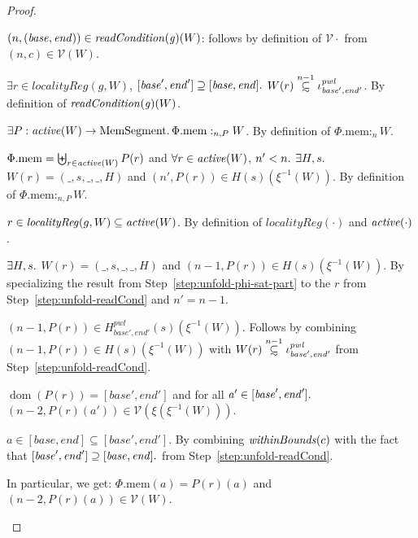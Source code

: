 \documentclass[a4paper]{article}
\newcommand\subsetsim{\mathrel{\ooalign{\raise.2ex\hbox{$\subset$}\cr
      \hidewidth\lower.8ex\hbox{\scalebox{0.9}{$\sim$}}\hidewidth\cr}}}
\newcommand{\nsubsim}[1][n]{\stackrel{\tiny{#1}}{\subsetsim}}
\DeclareMathOperator{\dom}{dom}
\newcommand{\var}[1]{\mathit{#1}}
\newcommand{\gl}{\var{g}}
\newcommand{\addr}{\var{a}}
\newcommand{\start}{\var{base}}
\newcommand{\addrend}{\var{end}}
\newcommand{\heap}{\var{mem}}
\newcommand{\pwl}{\var{pwl}}
\newcommand{\plainproj}[1]{\mathrm{#1}}
\newcommand{\memheap}[1][\Phi]{#1.\plainproj{mem}}
\newcommand{\plainfun}[2]{
  \ifthenelse{\equal{#2}{}}
  {\mathit{#1}}
  {\mathit{#1}(#2)}
}
\newcommand{\withinBounds}[1]{\plainfun{withinBounds}{#1}}
\newcommand{\readCond}[1]{\plainfun{readCondition}{#1}}
\newcommand{\activeReg}[1]{\plainfun{active}{#1}}
\newcommand{\heapSat}[3][\heap]{#1 :_{#2} #3}
\newcommand{\memSatPar}[4][n]{\heapSat[#2]{#1 , #4}{#3}}
\newcommand{\asmType}{\plaindom{AsmType}}
\newcommand{\plaindom}[1]{\mathrm{#1}}
\newcommand{\HeapSegments}{\plaindom{MemSegment}}
\newcommand{\intr}[2]{\mathcal{#1}}
\newcommand{\valueintr}[1]{\intr{V}{#1}}
\newcommand{\stdvr}{\valueintr{\asmType}}
\newcommand{\npair}[2][n]{\left(#1,#2 \right)}
\begin{document}
\begin{proof}
  \begin{enumproof}
  \item $\npair{(\start,\addrend)} \in \readCond{\gl}(W)$: follows by
    definition of $\stdvr{\cdot}$ from $\npair{c}\in\stdvr(W)$.
  \item $\exists r \in \var{localityReg}(g,W)$, $[\start',\addrend'] \supseteq
    [\start,\addrend] \ldotp$ $W(r)\nsubsim[n-1]
    \iota_{\start',\addrend'}^\pwl$. By definition of $\readCond{\gl}(W)$. \label{step:unfold-readCond}
  \item $\exists P : \activeReg{W} \rightarrow \HeapSegments \ldotp
    \memSatPar{\memheap}{W}{P}$. By definition of $\heapSat[\memheap]{n}{W}$.
  \item $\memheap = \biguplus_{r\in\activeReg{W}}P(r)$ and $\forall r \in
    \activeReg{W}$, $n'<n \ldotp$ $\exists H,s \ldotp$ $W(r) = (\_,s,\_,\_,H)$
    and $\npair[n']{P(r)} \in H(s)(\xi^{-1}(W))$. By definition of
    $\memSatPar{\memheap}{W}{P}$. \label{step:unfold-phi-sat-part}
  \item $r \in \var{localityReg}(g,W)\subseteq \activeReg{W}$. By definition of
    $\var{localityReg}(\cdot)$ and $\activeReg{\cdot}$.
  \item $\exists H,s \ldotp$ $W(r) = (\_,s,\_,\_,H)$
    and $\npair[n-1]{P(r)} \in H(s)(\xi^{-1}(W))$.
    By specializing the result from
    Step~\ref{step:unfold-phi-sat-part} to the $r$ from
    Step~\ref{step:unfold-readCond} and $n' = n-1$.
  \item $\npair[n-1]{P(r)} \in H^\pwl_{\start',\addrend'}(s)(\xi^{-1}(W))$.
    Follows by combining $\npair[n-1]{P(r)} \in H(s)(\xi^{-1}(W))$ with
    $W(r)\nsubsim[n-1] \iota_{\start',\addrend'}^\pwl$ from Step~\ref{step:unfold-readCond}.
  \item $\dom(P(r)) = [\start',\addrend']$ and for all $\addr' \in
    [\start',\addrend']\ldotp$
    $\npair[n-2]{P(r)(\addr')}\in\stdvr(\xi(\xi^{-1}(W)))$.
  \item $\addr \in [\start,\addrend]\subseteq[\start',\addrend']$. By combining
    $\withinBounds{c}$ with the fact that $[\start',\addrend'] \supseteq
    [\start,\addrend] \ldotp$ from Step~\ref{step:unfold-readCond}.
  \item In particular, we get: $\memheap(\addr) = P(r)(\addr)$ and
    $\npair[n-2]{P(r)(\addr)}\in\stdvr(W)$.
  \end{enumproof}
\end{proof}
\end{document}
